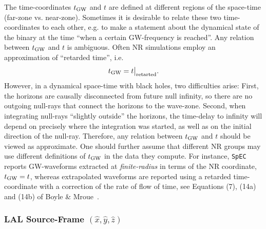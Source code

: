 \documentclass[11pt,tightenlines,article,amssymb,amsmath,amsfonts,superscriptaddress]{revtex4}
\newcommand{\tGW}{t_{\rm GW}}
\newcommand{\ExS}{{{\hat x}}}
\newcommand{\EyS}{{{\hat y}}}
\newcommand{\EzS}{{{\hat z}}}
\begin{document}
The time-coordinates $\tGW$ and $t$ are defined at different regions
of the space-time (far-zone vs. near-zone).  Sometimes it is desirable
to relate these two time-coordinates to each other, e.g. to make a
statement about the dynamical state of the binary at the time ``when a
certain GW-frequency is reached''.  Any relation between $\tGW$ and
$t$ is ambiguous.  Often NR simulations employ an approximation of
``retarded time'', i.e.
\begin{equation}
  \label{eq:tretarted}
  \tGW = t\big|_{\rm retarted}.
\end{equation}
However, in a dynamical space-time with black holes, two difficulties
arise: First, the horizons are causally disconnected from future null
infinity, so there are no outgoing null-rays that connect the horizons
to the wave-zone.  Second, when integrating null-rays ``slightly
outside'' the horizons, the time-delay to infinity will depend on
precisely where the integration was started, as well as on the initial
direction of the null-ray.  Therefore, any relation between $\tGW$ and
$t$ should be viewed as approximate.  One should further assume that
different NR groups may use different definitions of $\tGW$ in the
data they compute.  For instance, {\tt SpEC} reports GW-waveforms
extracted at \emph{finite-radius} in terms of the NR coordinate,
$\tGW=t$, whereas extrapolated waveforms are reported using a retarded
time-coordinate with a correction of the rate of flow of time, see
Equations (7), (14a) and (14b) of Boyle \& Mroue~\cite{Boyle:2009vi}.


\subsubsection{LAL Source-Frame \boldmath$(\ExS, \EyS, \EzS)$}
\end{document}
